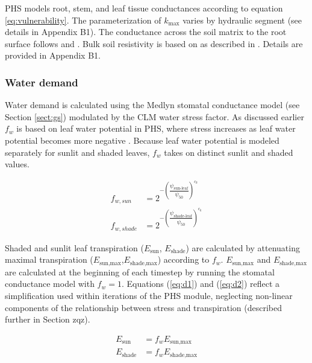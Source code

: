 \documentclass[draft,linenumbers]{agujournal}
\begin{document}
     PHS models root, stem, and leaf tissue conductances according to equation \ref{eq:vulnerability}. 
     The parameterization of $k_{\text{max}}$ varies by hydraulic segment (see details in Appendix B1). 
     The conductance across the soil matrix to the root surface follows \citet{williams2001} and \citet{bonan2014}. 
     Bulk soil resistivity is based on \citet{clapp1978} as described in \citet{oleson2013}. 
     Details are provided in Appendix B1.
    
    \subsubsection{Water demand}
    \label{sect:demand}
    
    Water demand is calculated using the Medlyn stomatal conductance model (see Section \ref{sect:gs}) modulated by the CLM water stress factor.
    As discussed earlier $f_w$ is based on leaf water potential in PHS, where stress increases as leaf water potential becomes more negative \citep{klein2014}.
    Because leaf water potential is modeled separately for sunlit and shaded leaves, $f_w$ takes on distinct sunlit and shaded values.
    
     \begin{linenomath*}
     \begin{equation}
     \begin{aligned}
     \label{eq:d1}
     f_{w,sun} &= 2^{-\left(\dfrac{\psi_{\text{sun-leaf}}}{\psi_{50}}\right)^{c_k}} \\
     f_{w,shade} &= 2^{-\left(\dfrac{\psi_{\text{shade-leaf}}}{\psi_{50}}\right)^{c_k}}
     \end{aligned}     
     \end{equation}
     \end{linenomath*}
     
     Shaded and sunlit leaf transpiration ($E_{\text{sun}}$, $E_{\text{shade}}$) are calculated by attenuating maximal transpiration ($E_{\text{sun,max}}$,$E_{\text{shade,max}}$) according to $f_w$. 
     $E_{\text{sun,max}}$ and $E_{\text{shade,max}}$ are calculated at the beginning of each timestep by running the stomatal conductance model with $f_w=1$.
     Equations (\ref{eq:d1}) and (\ref{eq:d2}) reflect a simplification used within iterations of the PHS module, 
     neglecting non-linear components of the relationship between stress and transpiration (described further in Section zqz).
     
     \begin{linenomath*}
     \begin{equation}
     \begin{aligned}
     \label{eq:d2}
     E_{\text{sun}} & = f_wE_{\text{sun,max}} \\
     E_{\text{shade}} & = f_wE_{\text{shade,max}}
     \end{aligned}     
     \end{equation}
     \end{linenomath*}
     
\end{document}
